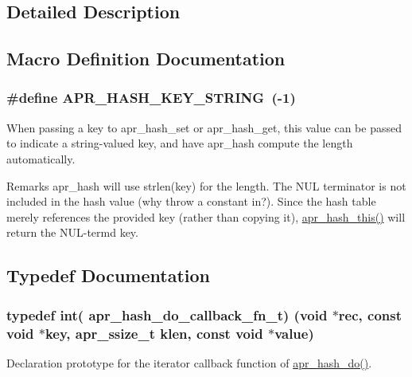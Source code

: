 \subsection{Detailed Description}


\subsection{Macro Definition Documentation}
\subsubsection[{\texorpdfstring{A\+P\+R\+\_\+\+H\+A\+S\+H\+\_\+\+K\+E\+Y\+\_\+\+S\+T\+R\+I\+NG}{APR_HASH_KEY_STRING}}]{\setlength{\rightskip}{0pt plus 5cm}\#define A\+P\+R\+\_\+\+H\+A\+S\+H\+\_\+\+K\+E\+Y\+\_\+\+S\+T\+R\+I\+NG~(-\/1)}\hypertarget{group__apr__hash_ga3ba32541f2717b394000f87f38c7e12d}{}\label{group__apr__hash_ga3ba32541f2717b394000f87f38c7e12d}
When passing a key to apr\+\_\+hash\+\_\+set or apr\+\_\+hash\+\_\+get, this value can be passed to indicate a string-\/valued key, and have apr\+\_\+hash compute the length automatically.

\begin{DoxyRemark}{Remarks}
apr\+\_\+hash will use strlen(key) for the length. The N\+UL terminator is not included in the hash value (why throw a constant in?). Since the hash table merely references the provided key (rather than copying it), \hyperlink{group__apr__hash_gad90e5b895397c2c535e32b3e44a75b3f}{apr\+\_\+hash\+\_\+this()} will return the N\+U\+L-\/term\textquotesingle{}d key. 
\end{DoxyRemark}


\subsection{Typedef Documentation}
\subsubsection[{\texorpdfstring{apr\+\_\+hash\+\_\+do\+\_\+callback\+\_\+fn\+\_\+t}{apr_hash_do_callback_fn_t}}]{\setlength{\rightskip}{0pt plus 5cm}typedef int( apr\+\_\+hash\+\_\+do\+\_\+callback\+\_\+fn\+\_\+t) (void $\ast$rec, const void $\ast$key, apr\+\_\+ssize\+\_\+t klen, const void $\ast$value)}\hypertarget{group__apr__hash_ga9352d7eed661ad06b7635314530a3227}{}\label{group__apr__hash_ga9352d7eed661ad06b7635314530a3227}
Declaration prototype for the iterator callback function of \hyperlink{group__apr__hash_ga3f3bac64e281d9e7eb9fed6101031394}{apr\+\_\+hash\+\_\+do()}.


